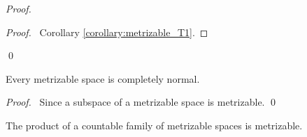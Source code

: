 \begin{proof}
    \pf
    \begin{proof}
        \pf\ Corollary \ref{corollary:metrizable_T1}.
    \end{proof}
    \qed
\end{proof}

\begin{corollary}
    Every metrizable space is completely normal.
\end{corollary}

\begin{proof}
    \pf\ Since a subspace of a metrizable space is metrizable. \qed
\end{proof}

\begin{proposition}[CC]
    \label{proposition:countable_product_metrizable}
    The product of a countable family of metrizable spaces is metrizable.
\end{proposition}

